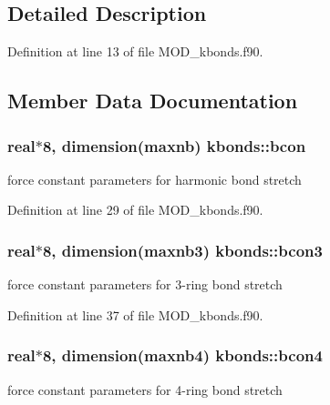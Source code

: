 \subsection{Detailed Description}


Definition at line 13 of file M\-O\-D\-\_\-kbonds.\-f90.



\subsection{Member Data Documentation}
\hypertarget{classkbonds_a5e6c3530241df6ea86379188ff398ace}{
\subsubsection[{bcon}]{\setlength{\rightskip}{0pt plus 5cm}real$\ast$8, dimension({\bf maxnb}) kbonds\-::bcon}}\label{classkbonds_a5e6c3530241df6ea86379188ff398ace}


force constant parameters for harmonic bond stretch 



Definition at line 29 of file M\-O\-D\-\_\-kbonds.\-f90.

\hypertarget{classkbonds_a8f800b1634aef288ebc94c6e9273cf22}{
\subsubsection[{bcon3}]{\setlength{\rightskip}{0pt plus 5cm}real$\ast$8, dimension({\bf maxnb3}) kbonds\-::bcon3}}\label{classkbonds_a8f800b1634aef288ebc94c6e9273cf22}


force constant parameters for 3-\/ring bond stretch 



Definition at line 37 of file M\-O\-D\-\_\-kbonds.\-f90.

\hypertarget{classkbonds_abd26bb67713fa4f4f0b92b9e2ec76ce7}{
\subsubsection[{bcon4}]{\setlength{\rightskip}{0pt plus 5cm}real$\ast$8, dimension({\bf maxnb4}) kbonds\-::bcon4}}\label{classkbonds_abd26bb67713fa4f4f0b92b9e2ec76ce7}


force constant parameters for 4-\/ring bond stretch 



